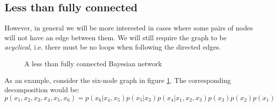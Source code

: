 \documentclass[12pt, a4paper]{article}
\numberwithin{equation}{section}
\begin{document}
\subsection{Less than fully connected}
However, in general we will be more interested in cases where some pairs of nodes will not have an edge between them. We will still require the graph to be \textit{acyclical}, i.e. there must be no loops when following the directed edges.

\begin{figure}
\centering
{}
\caption{A less than fully connected Bayesian network}
\label{graph:bn_notfull}
\end{figure}

As an example, consider the six-node graph in figure \ref{graph:bn_notfull}. The corresponding decomposition would be:
\begin{equation}
p(x_1, x_2, x_3, x_4, x_5, x_6)=p(x_6|x_4,x_5)p(x_5|x_3)p(x_4|x_1,x_2,x_3)p(x_3)p(x_2)p(x_1)
\end{equation}
\end{document}
